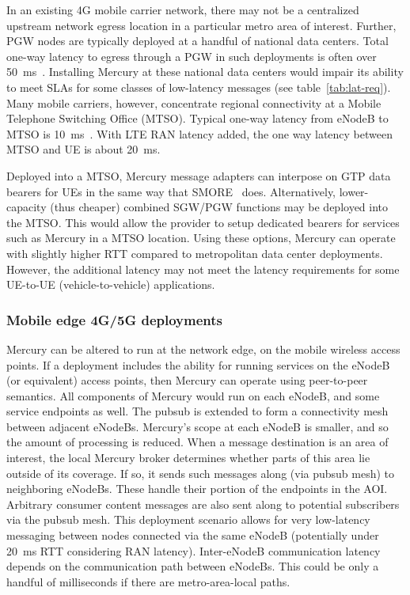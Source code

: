In an existing 4G mobile carrier network, there may not be a
centralized upstream network egress location in a particular metro
area of interest. Further, PGW nodes are typically deployed at a
handful of national data centers.  Total one-way latency to egress
through a PGW in such deployments is often over
50~ms~\cite{carrier-latency}. Installing Mercury at these national
data centers would impair its ability to meet SLAs for some classes of
low-latency messages (see table~\ref{tab:lat-req}). Many mobile
carriers, however, concentrate regional connectivity at a Mobile
Telephone Switching Office (MTSO).  Typical one-way latency from
eNodeB to MTSO is 10~ms~\cite{MTSO-latency}. With LTE RAN latency
added, the one way latency between MTSO and UE is about 20~ms.

Deployed into a MTSO, Mercury message adapters can interpose on GTP
data bearers for UEs in the same way that SMORE~\cite{cho2014smore}
does. Alternatively, lower-capacity (thus cheaper) combined SGW/PGW
functions may be deployed into the MTSO. This would allow the provider
to setup dedicated bearers for services such as Mercury in a MTSO
location.  Using these options, Mercury can operate with slightly
higher RTT compared to metropolitan data center deployments.  However,
the additional latency may not meet the latency requirements for some
UE-to-UE (vehicle-to-vehicle) applications.

\subsubsection{Mobile edge 4G/5G deployments}

Mercury can be altered to run at the network edge, on the mobile
wireless access points.  If a deployment includes the ability for
running services on the eNodeB (or equivalent) access points, then
Mercury can operate using peer-to-peer semantics.  All components of
Mercury would run on each eNodeB, and some service endpoints as
well. The pubsub is extended to form a connectivity mesh between
adjacent eNodeBs. Mercury's scope at each eNodeB is smaller, and so
the amount of processing is reduced. When a message destination is an
area of interest, the local Mercury broker determines whether parts of
this area lie outside of its coverage.  If so, it sends such messages
along (via pubsub mesh) to neighboring eNodeBs. These handle their
portion of the endpoints in the AOI.  Arbitrary consumer content
messages are also sent along to potential subscribers via the pubsub
mesh.  This deployment scenario allows for very low-latency messaging
between nodes connected via the same eNodeB (potentially under 20~ms
RTT considering RAN latency). Inter-eNodeB communication latency
depends on the communication path between eNodeBs.  This could be only
a handful of milliseconds if there are metro-area-local paths.


